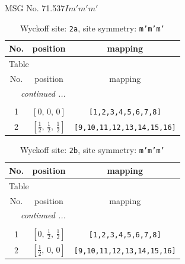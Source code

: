 \documentclass[fleqn,8pt]{jsarticle}
\begin{document}
\setcounter{MaxMatrixCols}{32}

\renewcommand{\tablename}{Table~}
\renewcommand{\figurename}{Figure~}
\begin{center}
\LARGE
MSG No. 71.537\quad$Im'm'm'$
\end{center}
\renewcommand{\arraystretch}{1.2}
\begin{longtable}{ccc}
\caption{Wyckoff site: {\tt 2a}, site symmetry: {\tt m'm'm'}}
 \\
 \hline \hline
No. & position & mapping \\ \hline \endfirsthead

\multicolumn{2}{l}{\tablename\ \thetable{}} \\
 \hline \hline
No. & position & mapping \\ \hline \endhead

 \hline \hline
\multicolumn{2}{r}{\footnotesize\it continued ...} \\ \endfoot

 \hline \hline
\multicolumn{2}{r}{} \\ \endlastfoot

1 & $\left[ 0,\, 0,\, 0 \right]$ & {\tt [1,2,3,4,5,6,7,8]} \\ \hline
2 & $\left[ \frac{1}{2},\, \frac{1}{2},\, \frac{1}{2} \right]$ & {\tt [9,10,11,12,13,14,15,16]} \\
\end{longtable}
\renewcommand{\arraystretch}{1.2}
\begin{longtable}{ccc}
\caption{Wyckoff site: {\tt 2b}, site symmetry: {\tt m'm'm'}}
 \\
 \hline \hline
No. & position & mapping \\ \hline \endfirsthead

\multicolumn{2}{l}{\tablename\ \thetable{}} \\
 \hline \hline
No. & position & mapping \\ \hline \endhead

 \hline \hline
\multicolumn{2}{r}{\footnotesize\it continued ...} \\ \endfoot

 \hline \hline
\multicolumn{2}{r}{} \\ \endlastfoot

1 & $\left[ 0,\, \frac{1}{2},\, \frac{1}{2} \right]$ & {\tt [1,2,3,4,5,6,7,8]} \\ \hline
2 & $\left[ \frac{1}{2},\, 0,\, 0 \right]$ & {\tt [9,10,11,12,13,14,15,16]} \\
\end{longtable}
\end{document}
